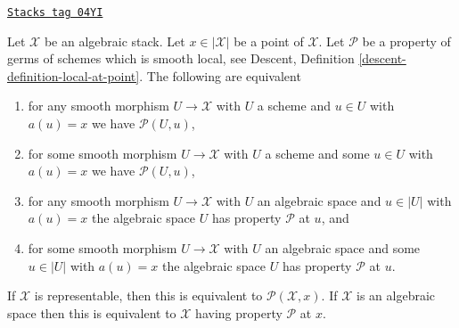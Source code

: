 \begin{lemma}
\label{stacks-properties-lemma-local-source-target-at-point}
\href{https://stacks.math.columbia.edu/tag/04YI}{\texttt{Stacks tag 04YI}}

Let $\mathcal{X}$ be an algebraic stack.
Let $x \in |\mathcal{X}|$ be a point of $\mathcal{X}$.
Let $\mathcal{P}$ be a property of germs of schemes which is smooth local, see
Descent, Definition \ref{descent-definition-local-at-point}.
The following are equivalent
\begin{enumerate}
\item for any smooth morphism $U \to \mathcal{X}$ with $U$ a scheme
and $u \in U$ with $a(u) = x$ we have $\mathcal{P}(U, u)$,
\item for some smooth morphism $U \to \mathcal{X}$ with $U$ a scheme
and some $u \in U$ with $a(u) = x$ we have $\mathcal{P}(U, u)$,
\item for any smooth morphism $U \to \mathcal{X}$ with $U$ an algebraic space
and $u \in |U|$ with $a(u) = x$ the algebraic space $U$ has property
$\mathcal{P}$ at $u$, and
\item for some smooth morphism $U \to \mathcal{X}$ with $U$ an
algebraic space and some $u \in |U|$ with $a(u) = x$ the algebraic space
$U$ has property $\mathcal{P}$ at $u$.
\end{enumerate}
If $\mathcal{X}$ is representable, then this is equivalent to
$\mathcal{P}(\mathcal{X}, x)$. If $\mathcal{X}$ is an algebraic space then
this is equivalent to $\mathcal{X}$ having property $\mathcal{P}$ at $x$.
\end{lemma}


